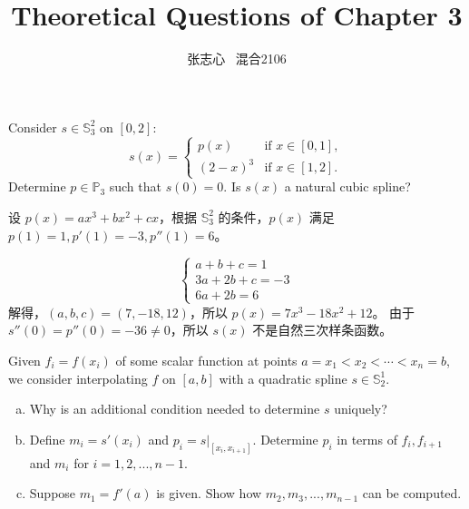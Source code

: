 \documentclass[lang=cn,a4paper,newtx,bibend=bibtex]{elegantpaper}
\title{Theoretical Questions of Chapter 3}
\author{张志心 \ 混合2106}
\date{\zhdate{2023/11/15}}
\begin{document}
\maketitle



\begin{prob}[3.6.1-\textrm{I}.]
  Consider $s\in\mathbb{S}_3^2$ on $[0,2]$:
  \begin{equation*}
    s(x)=\begin{cases} p(x) & \text{if~} x\in[0,1],\\ (2-x)^3 & \text{if~} x\in[1,2].\end{cases}
  \end{equation*}
  Determine $p\in\mathbb{P}_3$ such that $s(0)=0$.
  Is $s(x)$ a natural cubic spline?
\end{prob}

\begin{solution}
设 $p(x) = ax^3 + bx^2 + cx$，根据 $\mathbb{S}_3^2$ 的条件，$p(x)$ 满足
$p(1) = 1, p'(1) = -3, p''(1) = 6$。

\begin{equation*}
  \begin{cases}
    a + b + c = 1 \\
    3a + 2b + c = -3 \\
    6a + 2b = 6
  \end{cases}
\end{equation*}
  解得，$(a, b, c) = (7, -18, 12)$，所以 $p(x) = 7x^3 - 18 x^2 + 12$。
  由于 $s''(0) = p''(0) = -36 \neq 0$，所以 $s(x)$ 不是自然三次样条函数。
\end{solution}

\begin{prob}[3.6.1-\textrm{II}.]
  Given $f_i=f(x_i)$ of some scalar function at points $a= x_1 < x_2 < \cdots < x_n = b$, we consider interpolating $f$ on $[a,b]$ with a quadratic spline $s\in\mathbb{S}_2^1$.
  \begin{enumerate}[(a)]
    \item Why is an additional condition needed to determine $s$ uniquely?
    \item Define $m_i=s'(x_i)$ and $p_i=s\big|_{[x_i,x_{i+1}]}$. Determine $p_i$ in terms of $f_i,f_{i+1}$ and $m_i$ for $i=1,2,...,n-1$.
    \item Suppose $m_1=f'(a)$ is given. Show how $m_2,m_3,...,m_{n-1}$ can be computed.
  \end{enumerate}
\end{prob}
\end{document}
